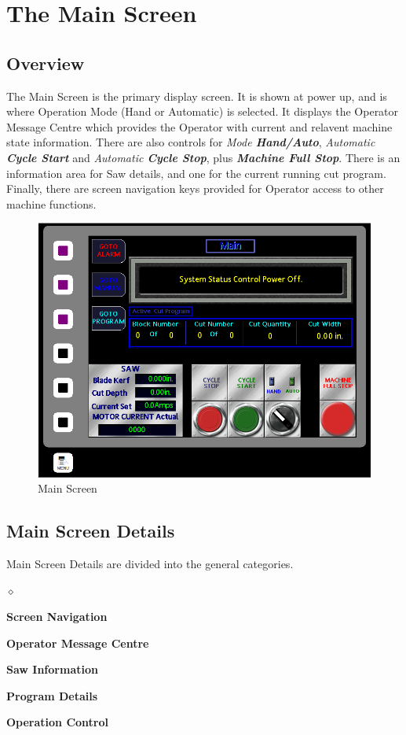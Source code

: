\chapter{The Main Screen}
\section{Overview}
The Main Screen is the primary display screen. It is shown at power up, and is where Operation Mode (Hand or Automatic) is selected. It displays the Operator Message Centre which provides the Operator with current and relavent machine state information. There are also controls for \textit{Mode \textbf{Hand/Auto}}, \textit{Automatic \textbf{Cycle Start}} and \textit{Automatic \textbf{Cycle Stop}}, plus \textbf{\textit{Machine Full Stop}}. There is an information area for Saw details, and one for the current running cut program. Finally, there are screen navigation keys provided for Operator access to other machine functions.
\begin{figure}
	\centering
	\includegraphics[width=0.5\linewidth]{screen-captures/main-screen}
	\caption{Main Screen}
	\label{fig:main-screen}
\end{figure}
\pagebreak
\section{Main Screen Details}
Main Screen Details are divided into the general categories.
\begin{list}{$\diamond$}{}
	\item \textbf{Screen Navigation}
	\item \textbf{Operator Message Centre}
	\item \textbf{Saw Information}
	\item \textbf{Program Details}
	\item \textbf{Operation Control}
\end{list}

